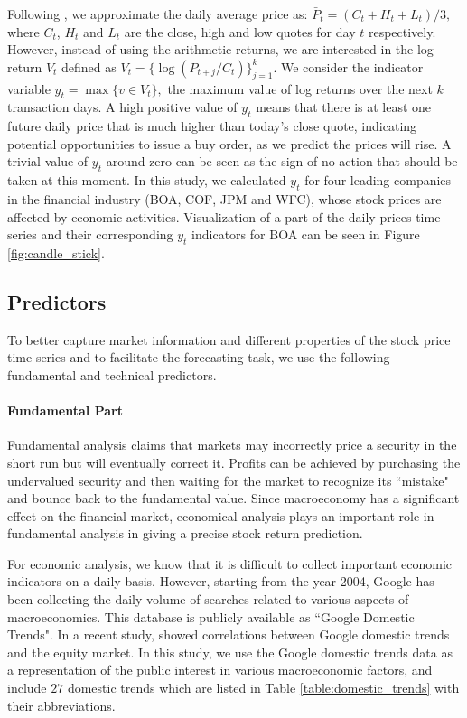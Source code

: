 \documentclass[twoside,11pt]{article}
\begin{document}
Following \cite{torgo2011data}, we approximate the daily average price as:
$
\bar{P}_t =(C_t+H_t+L_t)/3,
$
where $C_t$, $H_t$ and $L_t$ are the close, high and low quotes for day $t$ respectively. However, instead of using the arithmetic returns, we are interested in the log return $V_t$ defined as $
V_t = \{\log(\bar{P}_{t+j}/C_t)\}_{j=1}^k.
$
We consider the indicator variable $
y_t = \max\{v\in V_t\},
$ the maximum value of log returns over the next $k$ transaction days.
A high positive value of $y_t$ means that there is at least one future daily price that is much higher than today's close quote, indicating potential opportunities to issue a buy order, as we predict the prices will rise. A trivial value of $y_t$ around zero can be seen as the sign of no action that should be taken at this moment. In this study, we calculated $y_t $ for four leading companies in the financial industry (BOA, COF, JPM and WFC), whose stock prices are affected by economic activities. Visualization of a part of the daily prices time series and their corresponding $y_t$ indicators for BOA can be seen in Figure \ref{fig:candle_stick}.


\subsection{Predictors} To better capture market information and different properties of the stock price time series and to facilitate the forecasting task, we use the following fundamental and technical predictors.

\paragraph{Fundamental Part}
Fundamental analysis claims that markets may incorrectly price a security in the short run but will eventually correct it. Profits can be achieved by purchasing the undervalued security and then waiting for the market to recognize its ``mistake" and bounce back to the fundamental value. Since macroeconomy has a significant effect on the financial market, economical analysis plays an important role in fundamental analysis in giving a precise stock return prediction.

For economic analysis, we know that it is difficult to collect important economic indicators on a daily basis. However, starting from the year 2004, Google has been collecting the daily volume of searches related to various aspects of macroeconomics. This database is publicly available as ``Google Domestic Trends". In a recent study, \cite{preis2013quantifying} showed correlations between Google domestic trends and the equity market. In this study, we use the Google domestic trends data as a representation of the public interest in various macroeconomic factors, and  include $27$ domestic trends which are listed in Table \ref{table:domestic_trends} with their abbreviations.
\end{document}

